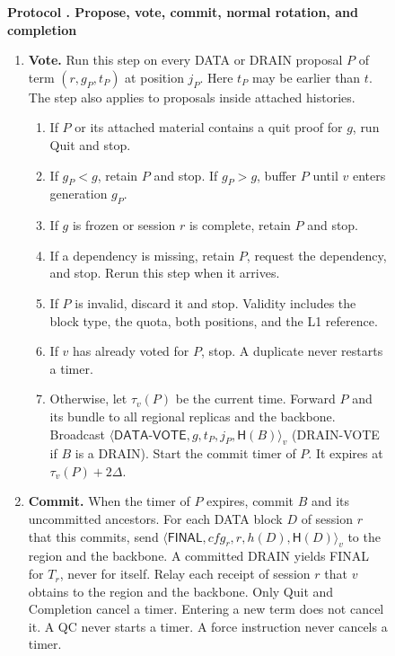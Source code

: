 \documentclass[11pt,a4paper]{article}
\newcommand{\RR}[1]{{\color{rrRed}#1}}
\newcommand{\Hash}{\mathsf H}
\newcommand{\tagg}[1]{\ensuremath{\mathsf{#1}}}
\newcounter{protocol}
\newenvironment{protocol}[2]{\begin{figure}[htbp]\refstepcounter{protocol}\label{#1}
\begin{mdframed}[linewidth=.6pt,skipabove=0pt,skipbelow=0pt,
innertopmargin=7pt,innerbottommargin=7pt]\small
\textbf{Protocol \theprotocol. #2}\par\smallskip}{\end{mdframed}\end{figure}}
\begin{document}
\begin{protocol}{alg:steady}{Propose, vote, commit, normal rotation\RR{, and completion}}
\begin{enumerate}[label=\textbf{\arabic*)},itemsep=3pt]
\item \textbf{Vote.} Run this step on every DATA \RR{or DRAIN} proposal
$P$ of term $(r,g_P,t_P)$ at position $j_P$. Here $t_P$ may be earlier
than $t$. The step also applies to proposals inside attached histories.
 \begin{enumerate}[label=(\alph*)]
 \item If $P$ or its attached material contains a quit proof for $g$,
       run Quit and stop.
 \item If $g_P<g$, retain $P$ and stop. If $g_P>g$, buffer $P$
       until $v$ enters generation $g_P$.
 \item If $g$ is frozen \RR{or session $r$ is complete}, retain $P$ and
       stop.
 \item If a dependency is missing, retain $P$, request the dependency,
       and stop. Rerun this step when it arrives.
 \item If $P$ is invalid, discard it and stop. \RR{Validity includes the
       block type, the quota, both positions, and the L1 reference.}
 \item If $v$ has already voted for $P$, stop.
       A duplicate never restarts a timer.
 \item Otherwise, let $\tau_v(P)$ be the current time. Forward $P$ and
       its bundle to all \RR{regional replicas and the backbone. }
       Broadcast
       $\langle\tagg{DATA\mbox{-}VOTE},g,t_P,j_P,\Hash(B)\rangle_v$
       \RR{(DRAIN-VOTE if $B$ is a DRAIN)}.
       Start the commit timer of $P$. It expires at $\tau_v(P)+2\Delta$.
 \end{enumerate}

\item \textbf{Commit.} When the timer of $P$ expires, commit $B$ and
its uncommitted ancestors. \RR{For each DATA block $D$ of session $r$
that this commits, send
$\langle\tagg{FINAL},\mathit{cfg}_r,r,h(D),\Hash(D)\rangle_v$ to the region
and the backbone. A committed DRAIN yields FINAL for $T_r$, never for
itself. Relay each receipt of session $r$ that $v$ obtains to the region
and the backbone.} Only Quit \RR{and Completion} cancel a timer. Entering a
new term does not cancel it. A QC never starts a timer. \RR{A force
instruction never cancels a timer.}


\end{enumerate}
\end{protocol}
\end{document}
